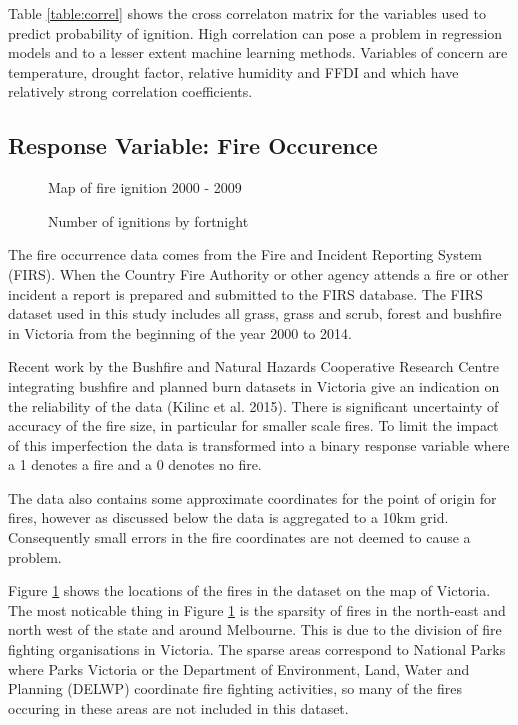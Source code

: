 \documentclass[11pt,a4paper]{article}
\begin{document}
Table \ref{table:correl} shows the cross correlaton matrix for the variables used to predict probability of ignition. High correlation can pose a problem in regression models and to a lesser extent machine learning methods. Variables of concern are temperature, drought factor, relative humidity and FFDI and  which have relatively strong correlation coefficients. 

\subsection{Response Variable: Fire Occurence}

\begin{figure}[h]
	\centering 
	\caption{Map of fire ignition 2000 - 2009} 
	\label{fig:firemap} 
\end{figure}

\begin{figure}[h]
	\centering 
	\caption{Number of ignitions by fortnight} 
	\label{fig:occ} 
\end{figure}

The fire occurrence data comes from the Fire and Incident Reporting System (FIRS). When the Country Fire Authority or other agency attends a fire or other incident a report is prepared and submitted to the FIRS database. The FIRS dataset used in this study includes all grass, grass and scrub, forest and bushfire in Victoria from the beginning of the year 2000 to 2014. 

Recent work by the Bushfire and Natural Hazards Cooperative Research Centre integrating bushfire and planned burn datasets in Victoria give an indication on the reliability of the data (Kilinc et al. 2015).  There is significant uncertainty of accuracy of the fire size, in particular for smaller scale fires. To limit the impact of this imperfection the data is transformed into a binary response variable where a 1 denotes a fire and a 0 denotes no fire. 

The data also contains some approximate coordinates for the point of origin for fires, however as discussed below the data is aggregated to a 10km grid. Consequently small errors in the fire coordinates are not deemed to cause a problem. 

Figure \ref{fig:firemap} shows the locations of the fires in the dataset on the map of Victoria. The most noticable thing in Figure \ref{fig:firemap} is the sparsity of fires in the north-east and north west of the state and around Melbourne. This is due to the division of fire fighting organisations in Victoria. The sparse areas correspond to National Parks where Parks Victoria or the Department of Environment, Land, Water and Planning (DELWP) coordinate fire fighting activities, so many of the fires occuring in these areas are not included in this dataset. 
\end{document}
